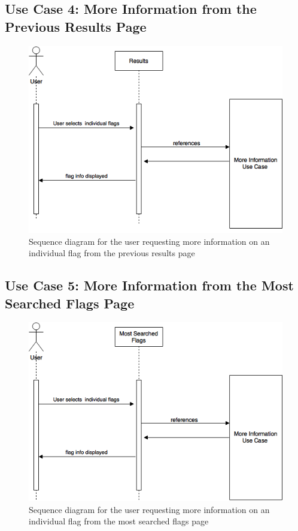 \documentclass[12pt,fleqn]{article}
\begin{document}
\subsection{Use Case 4: More Information from the Previous Results Page}
\begin{figure}[H]
    \centering
    \includegraphics[scale=0.6]{img/SD4.png}
    \caption{Sequence diagram for the user requesting more information on an individual flag from the previous results page}
\end{figure}

\subsection{Use Case 5: More Information from the Most Searched Flags Page}
\begin{figure}[H]
    \centering
    \includegraphics[scale=0.6]{img/SD5.png}
    \caption{Sequence diagram for the user requesting more information on an individual flag from the most searched flags page}
\end{figure}
\end{document}
